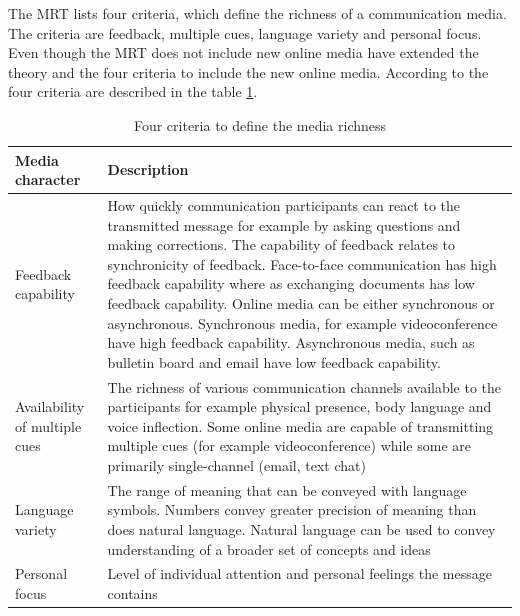 \documentclass[english,12pt,a4paper,pdftex]{article}
\begin{document}
The \ac{MRT} lists four criteria, which define the richness of a communication media. The criteria are feedback, multiple cues, language variety and personal focus. Even though the \ac{MRT} does not include new online media \citet{graveline2000} have extended the theory and the four criteria to include the new online media. According to \citet{graveline2000} the four criteria are described in the table \ref{table:criteria_media_richness}.


\begin{table}[!h]
\renewcommand{\arraystretch}{1.3}
\caption{Four criteria to define the media richness \citep{graveline2000} \citep{daft1987}}
\label{table:criteria_media_richness}
\centering
\begin{tabular}{|p{4cm}|p{10cm}|}
\hline
\textbf{Media character} & \textbf{Description}\\
\hline
Feedback capability & How quickly communication participants can react to the transmitted message for example by asking questions and making corrections. The capability of feedback relates to synchronicity of feedback. Face-to-face communication has high feedback capability where as exchanging documents has low feedback capability. Online media can be either synchronous or asynchronous. Synchronous media, for example videoconference have high feedback capability. Asynchronous media, such as bulletin board and email have low feedback capability. \\
\hline
Availability of multiple cues & The richness of various communication channels available to the participants for example physical presence, body language and voice inflection. Some online media are capable of transmitting multiple cues (for example videoconference) while some are primarily single-channel (email, text chat) \\
\hline
Language variety & The range of meaning that can be conveyed with language symbols. Numbers convey greater precision of meaning than does natural language. Natural language can be used to convey understanding of a broader set of concepts and ideas \\
\hline
Personal focus & Level of individual attention and personal feelings the message contains \\
\hline
\end{tabular}
\end{table}
\end{document}
